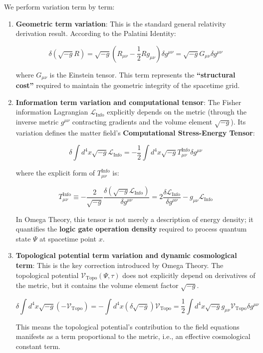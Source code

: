 We perform variation term by term:

\begin{enumerate}
\item \textbf{Geometric term variation}:
   This is the standard general relativity derivation result. According to the Palatini Identity:

\[\delta (\sqrt{-g} R) = \sqrt{-g} \left( R_{\mu\nu} - \frac{1}{2} R g_{\mu\nu} \right) \delta g^{\mu\nu} = \sqrt{-g} G_{\mu\nu} \delta g^{\mu\nu}\]

where $G_{\mu\nu}$ is the Einstein tensor. This term represents the \textbf{``structural cost''} required to maintain the geometric integrity of the spacetime grid.

\item \textbf{Information term variation and computational tensor}:
   The Fisher information Lagrangian $\mathcal{L}_{\text{Info}}$ explicitly depends on the metric (through the inverse metric $g^{\mu\nu}$ contracting gradients and the volume element $\sqrt{-g}$). Its variation defines the matter field's \textbf{Computational Stress-Energy Tensor}:

\[\delta \int d^4x \sqrt{-g} \mathcal{L}_{\text{Info}} = -\frac{1}{2} \int d^4x \sqrt{-g} T_{\mu\nu}^{\text{Info}} \delta g^{\mu\nu}\]

where the explicit form of $T_{\mu\nu}^{\text{Info}}$ is:

\[T_{\mu\nu}^{\text{Info}} \equiv -\frac{2}{\sqrt{-g}} \frac{\delta (\sqrt{-g} \mathcal{L}_{\text{Info}})}{\delta g^{\mu\nu}} = 2 \frac{\delta \mathcal{L}_{\text{Info}}}{\delta g^{\mu\nu}} - g_{\mu\nu} \mathcal{L}_{\text{Info}}\]

In Omega Theory, this tensor is not merely a description of energy density; it quantifies the \textbf{logic gate operation density} required to process quantum state $\Psi$ at spacetime point $x$.

\item \textbf{Topological potential term variation and dynamic cosmological term}:
   This is the key correction introduced by Omega Theory. The topological potential $\mathcal{V}_{\text{Topo}}(\Psi, \tau)$ does not explicitly depend on derivatives of the metric, but it contains the volume element factor $\sqrt{-g}$.

\[\delta \int d^4x \sqrt{-g} (-\mathcal{V}_{\text{Topo}}) = -\int d^4x (\delta \sqrt{-g}) \mathcal{V}_{\text{Topo}} = \frac{1}{2} \int d^4x \sqrt{-g} g_{\mu\nu} \mathcal{V}_{\text{Topo}} \delta g^{\mu\nu}\]

This means the topological potential's contribution to the field equations manifests as a term proportional to the metric, i.e., an effective cosmological constant term.
\end{enumerate}

